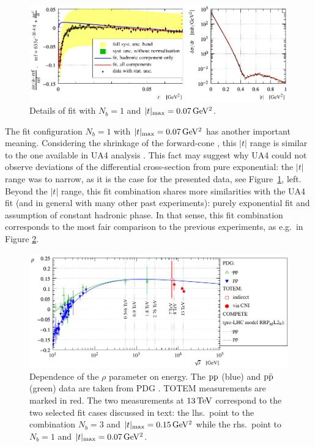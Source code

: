 \begin{figure}
\vskip-5mm
\begin{center}
\includegraphics{fig/fit_details_exp1_0p07.pdf}
\caption{%
Details of fit with $N_b = 1$ and $|t|_{\rm max} = 0.07\,{\rm GeV^2}$.
}
\label{fig:fit exp1 0.07}
\end{center}
\end{figure}


The fit configuration $N_b=1$ with $|t|_{\rm max} = 0.07\,{\rm GeV^2}$ has another important meaning. Considering the shrinkage of the forward-cone , this $|t|$ range is similar to the one available in UA4 analysis \cite{ua4-rho}. This fact may suggest why UA4 could not observe deviations of the differential cross-section from pure exponential: the $|t|$ range was to narrow, as it is the case for the presented data, see Figure~\ref{fig:fit exp1 0.07}, left. Beyond the $|t|$ range, this fit combination shares more similarities with the UA4 fit (and in general with many other past experiments): purely exponential fit and assumption of constant hadronic phase. In that sense, this fit combination corresponds to the most fair comparison to the previous experiments, as e.g.~in Figure \ref{fig:rho_vs_s}.

\begin{figure}
\vskip-5mm
\begin{center}
\includegraphics{fig/rho_vs_s.pdf}
\caption{%
Dependence of the $\rho$ parameter on energy. The $\rm pp$ (blue) and $\rm p\bar p$ (green) data are taken from PDG \cite{pdg}. TOTEM measurements are marked in red. The two measurements at $13\,{\rm TeV}$ correspond to the two selected fit cases discussed in text: the lhs.~point to the combination $N_b = 3$ and $|t|_{\rm max} = 0.15\,{\rm GeV^2}$ while the rhs.~point to $N_b = 1$ and $|t|_{\rm max} = 0.07\,{\rm GeV^2}$.
}
\label{fig:rho_vs_s}
\end{center}
\end{figure}



